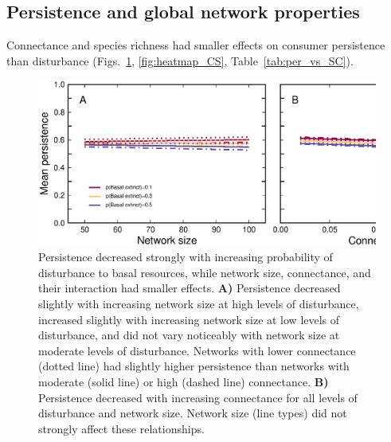 \documentclass[12pt]{article}
\begin{document}
\begin{spacing}{2.0}
            

\section{Persistence and global network properties}

    Connectance and species richness had smaller effects on consumer persistence than disturbance (Figs.~\ref{fig:lm_CS}, \ref{fig:heatmap_CS}, Table~\ref{tab:per_vs_SC}).

    \begin{figure}[h!]
        \centering
        \includegraphics[width=\textwidth]{figures/persistence_vs_SC_lm.eps}
        \caption{Persistence decreased strongly with increasing probability of disturbance to basal resources, while network size, connectance, and their interaction had smaller effects. \textbf{A)} Persistence decreased slightly with increasing network size at high levels of disturbance, increased slightly with increasing network size at low levels of disturbance, and did not vary noticeably with network size at moderate levels of disturbance. Networks with lower connectance (dotted line) had slightly higher persistence than networks with moderate (solid line) or high (dashed line) connectance.
        \textbf{B)} Persistence decreased with increasing connectance for all levels of disturbance and network size. Network size (line types) did not strongly affect these relationships.}
        \label{fig:lm_CS}
    \end{figure}




\end{spacing}
\end{document}
